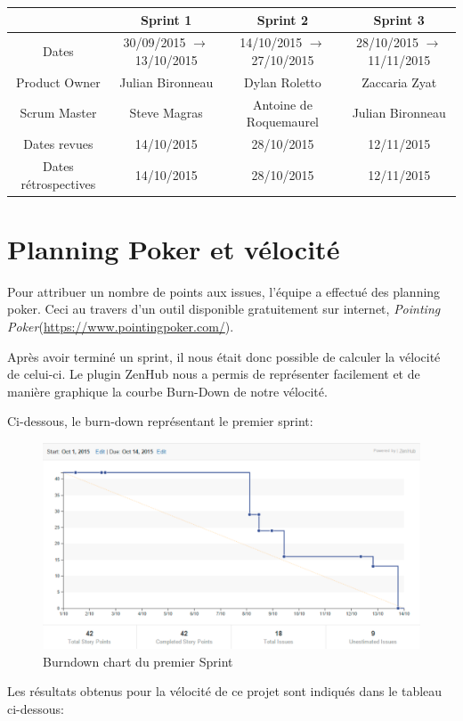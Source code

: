 \documentclass[12pt,a4paper,oneside]{book}
\begin{document}
	\hspace{-40px}
	\begin{tabular}{|c|c|c|c|}
		\hline
		& \textbf{Sprint 1 }& \textbf{Sprint 2 }& \textbf{Sprint 3}\\
		\hline
		Dates & 30/09/2015 $\rightarrow$ 13/10/2015 & 14/10/2015 $\rightarrow$ 27/10/2015 & 28/10/2015 $\rightarrow$ 11/11/2015\\
		\hline
		Product Owner & Julian Bironneau &Dylan Roletto& Zaccaria Zyat\\
		\hline
		Scrum Master & Steve Magras & Antoine de Roquemaurel &Julian Bironneau\\
		\hline
		Dates revues & 14/10/2015& 28/10/2015& 12/11/2015\\
		\hline
		Dates rétrospectives & 14/10/2015& 28/10/2015 &12/11/2015 \\
		\hline
	\end{tabular}
	
	\section{Planning Poker et vélocité}
	Pour attribuer un nombre de points aux issues, l'équipe a effectué des planning poker. Ceci au travers d'un outil disponible
	gratuitement sur internet, \textit{Pointing Poker}\newline (\url{https://www.pointingpoker.com/}).
	
	Après avoir terminé un sprint, il nous était donc possible de calculer la vélocité de celui-ci. Le plugin ZenHub nous a permis de représenter facilement et de manière graphique la courbe Burn-Down de notre vélocité. 
	
	Ci-dessous, le burn-down représentant le premier sprint:
	\begin{figure}[H]
		\includegraphics[width=18cm]{../beamer/images/Results/methodo/burndown.png}
		\caption{Burndown chart du premier Sprint}
	\end{figure}
	Les résultats obtenus pour la vélocité de ce projet sont indiqués dans le tableau ci-dessous:
\end{document}
